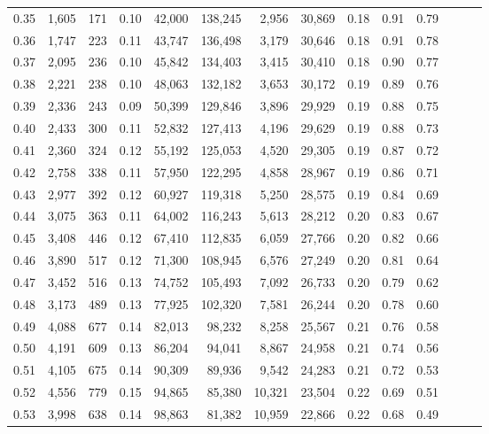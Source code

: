 \begin{tabular}{rrrrrrrrrrrrrr}
0.35 &  1,605 &  171 &  0.10 &   42,000 &  138,245 &   2,956 &  30,869 &  0.18 &  0.91 &      0.79 \\
0.36 &  1,747 &  223 &  0.11 &   43,747 &  136,498 &   3,179 &  30,646 &  0.18 &  0.91 &      0.78 \\
0.37 &  2,095 &  236 &  0.10 &   45,842 &  134,403 &   3,415 &  30,410 &  0.18 &  0.90 &      0.77 \\
0.38 &  2,221 &  238 &  0.10 &   48,063 &  132,182 &   3,653 &  30,172 &  0.19 &  0.89 &      0.76 \\
0.39 &  2,336 &  243 &  0.09 &   50,399 &  129,846 &   3,896 &  29,929 &  0.19 &  0.88 &      0.75 \\
0.40 &  2,433 &  300 &  0.11 &   52,832 &  127,413 &   4,196 &  29,629 &  0.19 &  0.88 &      0.73 \\
0.41 &  2,360 &  324 &  0.12 &   55,192 &  125,053 &   4,520 &  29,305 &  0.19 &  0.87 &      0.72 \\
0.42 &  2,758 &  338 &  0.11 &   57,950 &  122,295 &   4,858 &  28,967 &  0.19 &  0.86 &      0.71 \\
0.43 &  2,977 &  392 &  0.12 &   60,927 &  119,318 &   5,250 &  28,575 &  0.19 &  0.84 &      0.69 \\
0.44 &  3,075 &  363 &  0.11 &   64,002 &  116,243 &   5,613 &  28,212 &  0.20 &  0.83 &      0.67 \\
0.45 &  3,408 &  446 &  0.12 &   67,410 &  112,835 &   6,059 &  27,766 &  0.20 &  0.82 &      0.66 \\
0.46 &  3,890 &  517 &  0.12 &   71,300 &  108,945 &   6,576 &  27,249 &  0.20 &  0.81 &      0.64 \\
0.47 &  3,452 &  516 &  0.13 &   74,752 &  105,493 &   7,092 &  26,733 &  0.20 &  0.79 &      0.62 \\
0.48 &  3,173 &  489 &  0.13 &   77,925 &  102,320 &   7,581 &  26,244 &  0.20 &  0.78 &      0.60 \\
0.49 &  4,088 &  677 &  0.14 &   82,013 &   98,232 &   8,258 &  25,567 &  0.21 &  0.76 &      0.58 \\
0.50 &  4,191 &  609 &  0.13 &   86,204 &   94,041 &   8,867 &  24,958 &  0.21 &  0.74 &      0.56 \\
0.51 &  4,105 &  675 &  0.14 &   90,309 &   89,936 &   9,542 &  24,283 &  0.21 &  0.72 &      0.53 \\
0.52 &  4,556 &  779 &  0.15 &   94,865 &   85,380 &  10,321 &  23,504 &  0.22 &  0.69 &      0.51 \\
0.53 &  3,998 &  638 &  0.14 &   98,863 &   81,382 &  10,959 &  22,866 &  0.22 &  0.68 &      0.49 \\

\end{tabular}

